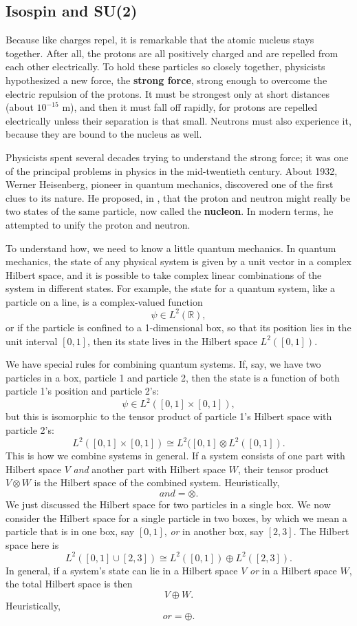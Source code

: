 \documentclass{article}
\newcommand{\R}{{\mathbb R}}  %
\newcommand{\iso}{\cong} %
\begin{document}
\subsection{Isospin and {\rm{SU(2)}}} \label{sec:isospin}

Because like charges repel, it is remarkable that the atomic nucleus
stays together. After all, the protons are all positively charged and
are repelled from each other electrically.  To hold these particles so
closely together, physicists hypothesized a new force, the
\textbf{strong force}, strong enough to overcome the electric
repulsion of the protons.  It must be strongest only at short
distances (about $10^{-15}$ m), and then it must fall off rapidly, for
protons are repelled electrically unless their separation is that
small.  Neutrons must also experience it, because they are bound to
the nucleus as well.

Physicists spent several decades trying to understand the strong force; it was
one of the principal problems in physics in the mid-twentieth century. About
1932, Werner Heisenberg, pioneer in quantum mechanics, discovered one of the
first clues to its nature. He proposed, in \cite{heisenberg:77}, that the
proton and neutron might really be two states of the same particle, now
called the \textbf{nucleon}.  In modern terms, he attempted to unify the 
proton and neutron. 

To understand how, we need to know a little quantum mechanics.
In quantum mechanics, the state of any physical system is given by a 
unit vector in a complex Hilbert space, and it is possible to take 
complex linear combinations of the system in different states.  For 
example, the state for a quantum system, like a particle on a line, 
is a complex-valued function 
\[	\psi \in L^2(\R) , 	\]
or if the particle is confined to a 1-dimensional box, so that its
position lies in the unit interval $[0,1]$, then its state lives 
in the Hilbert space $L^2([0,1])$.

We have special rules for combining quantum systems. If, say, we have two
particles in a box, particle 1 and particle 2, then the state is a
function of both particle 1's position and particle 2's:
\[	\psi \in L^2([0,1] \times [0,1]),	\]
but this is isomorphic to the tensor product of particle 1's Hilbert space with
particle 2's:
\[	L^2( [0,1] \times [0,1] ) \iso L^2([0,1] \otimes L^2([0,1]).	\]
This is how we combine systems in general. If a system consists of one part
with Hilbert space $V$ \emph{and} another part with Hilbert space $W$, 
their tensor product $V \otimes W$ is the Hilbert space of the combined system.
Heuristically, 
\[	\textit{and} = \otimes.	\]
We just discussed the Hilbert space for two particles in a single box. We now
consider the Hilbert space for a single particle in two boxes, by which we mean
a particle that is in one box, say $[0,1]$, \emph{or} in another box, say 
$[2,3]$.  The Hilbert space here is
\[	L^2( [0,1] \cup [2,3]) \iso L^2([0,1]) \oplus L^2([2,3]).	\]
In general, if a system's state can lie in a Hilbert space $V$ \emph{or} in a 
Hilbert space $W$, the total Hilbert space is then
\[	V \oplus W.	\]
Heuristically,
\[	\textit{or} = \oplus.	\]
\end{document}
